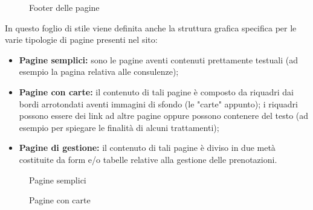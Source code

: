 \documentclass{article}
\begin{document}
\begin{figure}[H]
	\centering
	\caption{Footer delle pagine}
\end{figure}

In questo foglio di stile viene definita anche la struttura grafica specifica per le varie tipologie di pagine presenti nel sito:
\begin{itemize}
	\item \textbf{Pagine semplici:} sono le pagine aventi contenuti prettamente testuali (ad esempio la pagina relativa alle consulenze);
	\item \textbf{Pagine con carte:} il contenuto di tali pagine è composto da riquadri dai bordi arrotondati aventi immagini di sfondo (le "carte" appunto); i riquadri possono essere dei link ad altre pagine oppure possono contenere del testo (ad esempio per spiegare le finalità di alcuni trattamenti);
	\item \textbf{Pagine di gestione:} il contenuto di tali pagine è diviso in due metà costituite da form e/o tabelle relative alla gestione delle prenotazioni.
\end{itemize}

\begin{figure}[H]
	\centering
	\caption{Pagine semplici}
\end{figure}

\begin{figure}[H]
	\centering
	\caption{Pagine con carte}
\end{figure}
\end{document}
